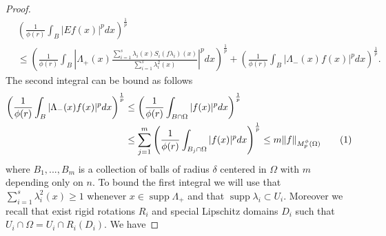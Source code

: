 \documentclass[12pt]{article}
\theoremstyle{definition}
\DeclareMathOperator\supp{supp}
\newcommand\addtag{\refstepcounter{equation}\tag{\theequation}}
\begin{document}
\begin{proof}
\begin{align*}
&\left( \frac{1}{\phi(r)} \int_B |Ef(x)|^pdx \right)^\frac{1}{p} \\
&\le\left( \frac{1}{\phi(r)} \int_B \left|\Lambda_+(x) \frac{\sum_{i=1}^s \lambda_i(x)S_i(f\lambda_i)(x)}{\sum_{i=1}^s \lambda_i^2(x)}\right|^pdx \right)^\frac{1}{p}+\left( \frac{1}{\phi(r)} \int_B |\Lambda_-(x)f(x) |^pdx \right)^\frac{1}{p}.
\end{align*}
The second integral can be bound as follows
\begin{align*}
\left( \frac{1}{\phi(r)} \int_B |\Lambda_-(x)f(x) |^pdx \right)^\frac{1}{p}&\le\left( \frac{1}{\phi(r)} \int_{B\cap\Omega} |f(x) |^pdx \right)^\frac{1}{p} \\
& \le \sum_{j=1}^m \left( \frac{1}{\phi(r)} \int_{B_j\cap\Omega} |f(x) |^pdx \right)^\frac{1}{p}\le m\|f\|_{M_p^\phi(\Omega)} \addtag \label{ezbound}
\end{align*}
where $B_1,...,B_m$ is a collection of balls of radius $\delta$ centered in $\Omega$ with $m$ depending only on $n.$ To bound the first integral we will use that $\sum_{i=1}^s \lambda_i^2(x)\ge 1$ whenever $x \in \supp \Lambda_+$ and that $\supp \lambda_i \subset U_i$. Moreover we recall that exist rigid rotations $R_i$ and special Lipschitz domains $D_i$ such that $U_i\cap \Omega=U_i\cap R_i(D_i)$. We have


\end{proof}
\end{document}
